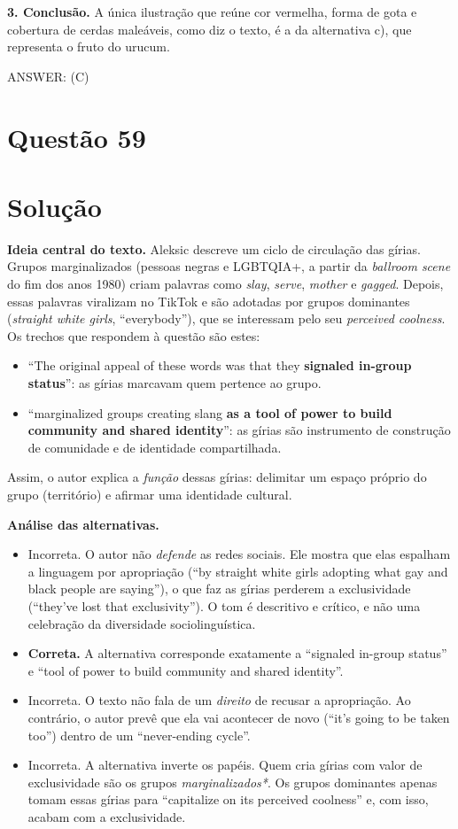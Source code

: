 \documentclass{article}%
\begin{document}
\textbf{3. Conclusão.} A única ilustração que reúne cor vermelha, forma de gota e cobertura de cerdas maleáveis, como diz o texto, é a da alternativa c), que representa o fruto do urucum.

ANSWER: (C)%
\newpage%
\section*{Questão 59}

\section*{Solução}

\textbf{Ideia central do texto.} Aleksic descreve um ciclo de circulação das gírias. Grupos marginalizados (pessoas negras e LGBTQIA+, a partir da \textit{ballroom scene} do fim dos anos 1980) criam palavras como \textit{slay}, \textit{serve}, \textit{mother} e \textit{gagged}. Depois, essas palavras viralizam no TikTok e são adotadas por grupos dominantes (\textit{straight white girls}, ``everybody''), que se interessam pelo seu \textit{perceived coolness}. Os trechos que respondem à questão são estes:
\begin{itemize}
  \item ``The original appeal of these words was that they \textbf{signaled in-group status}'': as gírias marcavam quem pertence ao grupo.
  \item ``marginalized groups creating slang \textbf{as a tool of power to build community and shared identity}'': as gírias são instrumento de construção de comunidade e de identidade compartilhada.
\end{itemize}
Assim, o autor explica a \emph{função} dessas gírias: delimitar um espaço próprio do grupo (território) e afirmar uma identidade cultural.

\textbf{Análise das alternativas.}
\begin{itemize}
  \item[a)] Incorreta. O autor não \emph{defende} as redes sociais. Ele mostra que elas espalham a linguagem por apropriação (``by straight white girls adopting what gay and black people are saying''), o que faz as gírias perderem a exclusividade (``they've lost that exclusivity''). O tom é descritivo e crítico, e não uma celebração da diversidade sociolinguística.
  \item[b)] \textbf{Correta.} A alternativa corresponde exatamente a ``signaled in-group status'' e ``tool of power to build community and shared identity''.
  \item[c)] Incorreta. O texto não fala de um \emph{direito} de recusar a apropriação. Ao contrário, o autor prevê que ela vai acontecer de novo (``it's going to be taken too'') dentro de um ``never-ending cycle''.
  \item[d)] Incorreta. A alternativa inverte os papéis. Quem cria gírias com valor de exclusividade são os grupos \emph{marginalizados*}. Os grupos dominantes apenas tomam essas gírias para ``capitalize on its perceived coolness'' e, com isso, acabam com a exclusividade.
\end{itemize}
\end{document}

